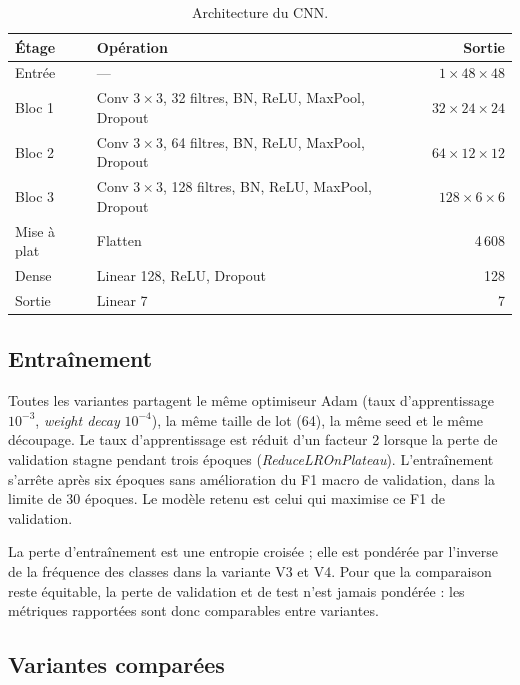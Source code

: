 \documentclass[11pt,a4paper]{article}
\begin{document}
\begin{table}[H]
\centering
\small
\caption{Architecture du CNN.}
\label{tab:archi}
\begin{tabular}{llr}
\toprule
Étage & Opération & Sortie \\
\midrule
Entrée        & ---                                   & $1\times48\times48$ \\
Bloc 1        & Conv $3\times3$, 32 filtres, BN, ReLU, MaxPool, Dropout & $32\times24\times24$ \\
Bloc 2        & Conv $3\times3$, 64 filtres, BN, ReLU, MaxPool, Dropout & $64\times12\times12$ \\
Bloc 3        & Conv $3\times3$, 128 filtres, BN, ReLU, MaxPool, Dropout & $128\times6\times6$ \\
Mise à plat   & Flatten                               & 4\,608 \\
Dense         & Linear 128, ReLU, Dropout             & 128 \\
Sortie        & Linear 7                              & 7 \\
\bottomrule
\end{tabular}
\end{table}

\subsection{Entraînement}

Toutes les variantes partagent le même optimiseur Adam (taux d'apprentissage
$10^{-3}$, \emph{weight decay} $10^{-4}$), la même taille de lot (64), la même
seed et le même découpage. Le taux d'apprentissage est réduit d'un facteur 2
lorsque la perte de validation stagne pendant trois époques
(\emph{ReduceLROnPlateau}). L'entraînement s'arrête après six époques sans
amélioration du F1 macro de validation, dans la limite de 30 époques. Le
modèle retenu est celui qui maximise ce F1 de validation.

La perte d'entraînement est une entropie croisée ; elle est pondérée par
l'inverse de la fréquence des classes dans la variante V3 et V4. Pour que la
comparaison reste équitable, la perte de validation et de test n'est jamais
pondérée : les métriques rapportées sont donc comparables entre variantes.

\subsection{Variantes comparées}
\end{document}
